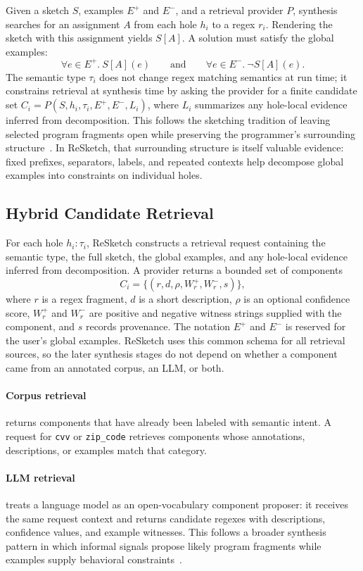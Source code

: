 \documentclass[sigconf,nonacm]{acmart}
\begin{document}
Given a sketch \(S\), examples \(E^+\) and \(E^-\), and a retrieval provider
\(P\), synthesis searches for an assignment \(A\) from each hole \(h_i\) to a regex \(r_i\). Rendering the sketch with this assignment yields
\(S[A]\). A solution must satisfy the global examples:
\[
  \forall e \in E^+.~S[A](e)
  \qquad\text{and}\qquad
  \forall e \in E^-.~\neg S[A](e).
\]
The semantic type \(\tau_i\) does not change regex matching semantics at run
time; it constrains retrieval at synthesis time by asking the provider for a
finite candidate set \(C_i = P(S,h_i,\tau_i,E^+,E^-,L_i)\), where \(L_i\)
summarizes any hole-local evidence inferred from decomposition. This follows the
sketching tradition of leaving selected program fragments open while preserving
the programmer's surrounding structure~\cite{solar2008sketching,solar2006combinatorial}.
In ReSketch, that surrounding structure is itself valuable evidence: fixed
prefixes, separators, labels, and repeated contexts help decompose global
examples into constraints on individual holes.

\subsection{Hybrid Candidate Retrieval}
For each hole \(h_i:\tau_i\), ReSketch constructs a retrieval request containing
the semantic type, the full sketch, the global examples, and any hole-local
evidence inferred from decomposition. A provider returns a bounded set of
components
\[
  C_i = \{(r, d, \rho, W_r^+, W_r^-, s)\},
\]
where \(r\) is a regex fragment, \(d\) is a short description, \(\rho\) is an
optional confidence score, \(W_r^+\) and \(W_r^-\) are positive and negative
witness strings supplied with the component, and \(s\) records provenance.
The notation \(E^+\) and \(E^-\) is reserved for the user's global examples.
ReSketch uses this common schema for all retrieval sources, so the later
synthesis stages do not depend on whether a component came from an annotated
corpus, an LLM, or both.

\paragraph{Corpus retrieval} returns components that have already been labeled
with semantic intent. A request for \texttt{cvv} or \texttt{zip\_code}
retrieves components whose annotations, descriptions, or examples match that
category.
\paragraph{LLM retrieval} treats a language model as an open-vocabulary
component proposer: it receives the same request context and returns candidate
regexes with descriptions, confidence values, and example witnesses. This
follows a broader synthesis pattern in which informal signals propose likely
program fragments while examples supply behavioral
constraints~\cite{rahmani2021multimodal,chen2020multimodal}.
\end{document}
